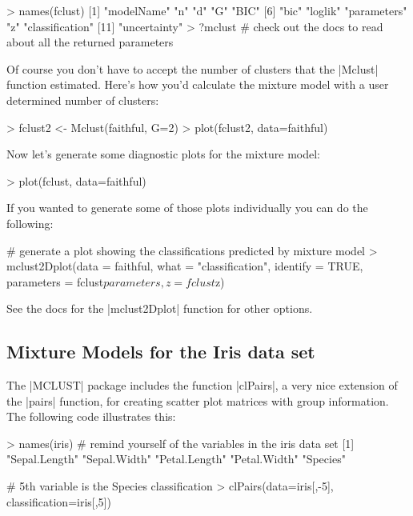 \begin{R}
> names(fclust)
 [1] "modelName"      "n"              "d"              "G"              "BIC"           
 [6] "bic"            "loglik"         "parameters"     "z"              "classification"
[11] "uncertainty"
> ?mclust  # check out the docs to read about all the returned parameters
\end{R}

Of course you don't have to accept the number of clusters that the |Mclust| function estimated. Here's how you'd calculate the mixture model with a user determined number of clusters:

\begin{R}
> fclust2 <- Mclust(faithful, G=2)
> plot(fclust2, data=faithful)    
\end{R}

Now let's generate some diagnostic plots for the mixture model:

\begin{R}
> plot(fclust, data=faithful)    
\end{R}

If you wanted to generate some of those plots individually you can do the following:

\begin{R}
# generate a plot showing the classifications predicted by mixture model    
> mclust2Dplot(data = faithful, what = "classification", identify = TRUE, 
    parameters = fclust$parameters, z = fclust$z)    
\end{R}

See the docs for the |mclust2Dplot| function for other options.

\subsection{Mixture Models for the Iris data set}

The |MCLUST| package includes the function |clPairs|, a very nice extension of the |pairs| function, for creating scatter plot matrices with group information. The following code illustrates this:

\begin{R}
> names(iris) # remind yourself of the variables in the iris data set
[1] "Sepal.Length" "Sepal.Width"  "Petal.Length" "Petal.Width"  "Species"    

# 5th variable is the Species classification
> clPairs(data=iris[,-5], classification=iris[,5]) 
\end{R}

